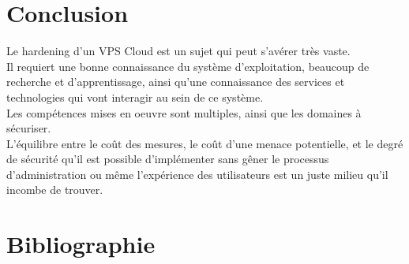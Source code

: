 \documentclass[a4paper,10pt,final,fleqn]{article}
\begin{document}
\begin{enumerate}
\begin{itemize}
						\end{itemize}
						
				\end{enumerate}

		\section{Conclusion}

			Le hardening d'un VPS Cloud est un sujet qui peut s'avérer très vaste.\\
			Il requiert une bonne connaissance du système d'exploitation, beaucoup de recherche et d'apprentissage, ainsi qu'une connaissance des services et technologies qui vont interagir au sein de ce système.\\
			Les compétences mises en oeuvre sont multiples, ainsi que les domaines à sécuriser.\\

			L'équilibre entre le coût des mesures, le coût d'une menace potentielle, et le degré de sécurité qu'il est possible d'implémenter sans gêner le processus d'administration ou même l'expérience des utilisateurs est un juste milieu qu'il incombe de trouver.\\

		\section{Bibliographie}
\end{document}
